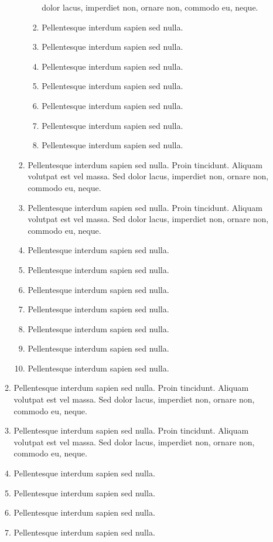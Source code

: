 \documentclass[ngerman]{scrartcl}
\begin{document}
\begin{enumerate}
\begin{enumerate}
\begin{enumerate}
\begin{enumerate}
		dolor lacus, imperdiet non, ornare non, commodo eu, neque.
								\item Pellentesque interdum sapien sed nulla.
								\item Pellentesque interdum sapien sed nulla.
								\item Pellentesque interdum sapien sed nulla.
								\item Pellentesque interdum sapien sed nulla.
								\item Pellentesque interdum sapien sed nulla.
								\item Pellentesque interdum sapien sed nulla.
								\item Pellentesque interdum sapien sed nulla.
							\end{enumerate}
						\item Pellentesque interdum sapien sed nulla. Proin tincidunt. Aliquam volutpat est vel massa. Sed
dolor lacus, imperdiet non, ornare non, commodo eu, neque.
						\item Pellentesque interdum sapien sed nulla. Proin tincidunt. Aliquam volutpat est vel massa. Sed
dolor lacus, imperdiet non, ornare non, commodo eu, neque.
						\item Pellentesque interdum sapien sed nulla.
						\item Pellentesque interdum sapien sed nulla.
						\item Pellentesque interdum sapien sed nulla.
						\item Pellentesque interdum sapien sed nulla.
						\item Pellentesque interdum sapien sed nulla.
						\item Pellentesque interdum sapien sed nulla.
						\item Pellentesque interdum sapien sed nulla.
					\end{enumerate}
				\item Pellentesque interdum sapien sed nulla. Proin tincidunt. Aliquam volutpat est vel massa. Sed
dolor lacus, imperdiet non, ornare non, commodo eu, neque.
				\item Pellentesque interdum sapien sed nulla. Proin tincidunt. Aliquam volutpat est vel massa. Sed
dolor lacus, imperdiet non, ornare non, commodo eu, neque.
				\item Pellentesque interdum sapien sed nulla.
				\item Pellentesque interdum sapien sed nulla.
				\item Pellentesque interdum sapien sed nulla.
				\item Pellentesque interdum sapien sed nulla.

\end{enumerate}
\end{enumerate}
\end{document}
